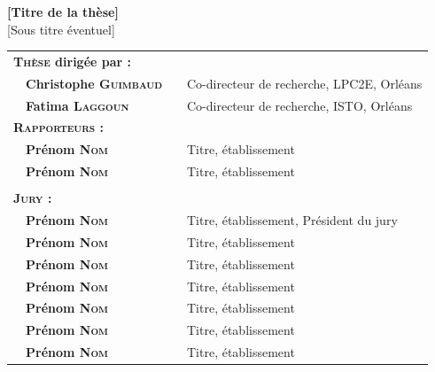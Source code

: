 {%
\vfill

\begin{framed}
	\begin{minipage}{\dimexpr\textwidth-2\fboxrule-2\fboxsep}
	\centering
		\vspace{0.2cm}
			{\Large\textbf{[Titre de la th\`ese]}\\ \vspace{0.3cm}
			[Sous titre \'eventuel]}
		\vspace{0.2cm}
	\end{minipage}
\end{framed}

} %

\vfill

\begin{center}
\begin{tabular}{l l l l}
\multicolumn{2}{l}{\textbf{\textsc{Thèse} dirig\'ee par : }} & & \\[.5ex]
	& \textbf{Christophe \textsc{Guimbaud}} &  &  Co-directeur de recherche, LPC2E, Orléans\\
	& \textbf{Fatima \textsc{Laggoun}} & &  Co-directeur de recherche, ISTO, Orléans\\[1ex]
\multicolumn{2}{l}{\textsc{\textbf{Rapporteurs :}}} & & \\[.5ex]
	& \textbf{Pr\'enom \textsc{Nom}} & &  Titre, \'etablissement\\
	& \textbf{Pr\'enom \textsc{Nom}} & &  Titre, \'etablissement\\[1ex]
\hline\\ [-1ex]
\multicolumn{2}{l}{\textsc{\textbf{Jury : }}} & &\\[.5ex]
	&\textbf{Pr\'enom \textsc{Nom}} &  & Titre, \'etablissement, Pr\'esident du jury\\
	&\textbf{Pr\'enom \textsc{Nom}} &  &  Titre, \'etablissement\\
	&\textbf{Pr\'enom \textsc{Nom}} &  &  Titre, \'etablissement\\
	&\textbf{Pr\'enom \textsc{Nom}} &  &  Titre, \'etablissement\\
	&\textbf{Pr\'enom \textsc{Nom}} &  &  Titre, \'etablissement\\
	&\textbf{Pr\'enom \textsc{Nom}} &  &  Titre, \'etablissement\\
	&\textbf{Pr\'enom \textsc{Nom}} &  &  Titre, \'etablissement\\
\end{tabular}
\end{center}

\vfill

\restoregeometry %
